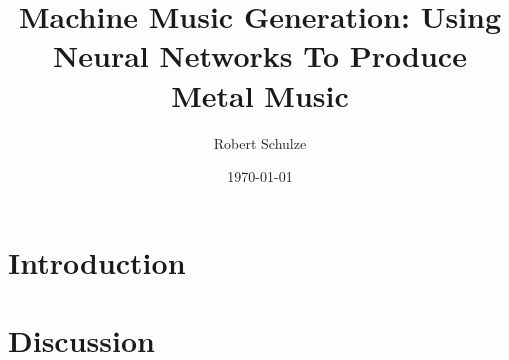 \documentclass[a4paper, 11pt]{report}
\author{Robert Schulze}
\title{Machine Music Generation: Using Neural Networks To Produce Metal Music}
\date{\today}
\begin{document}
\renewcommand{\thechapter}{\Roman{chapter}}

\maketitle

\tableofcontents

\chapter{Introduction}

\chapter{Discussion}



\end{document}
